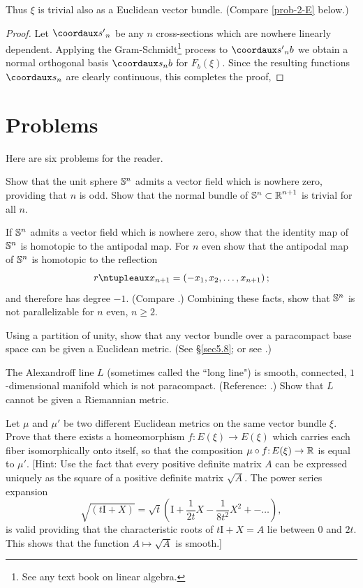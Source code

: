 Thus $\xi$ is trivial also as a Euclidean vector bundle. (Compare
\cref{prob-2-E} below.)
\begin{proof}
	Let $\coord{{s'}_n}$ be any $n$ cross-sections which are nowhere
	linearly dependent. Applying the Gram-Schmidt\footnote{See any text book on linear algebra.} process to $\coord{{s'}_nb}$
	we obtain a normal orthogonal basis $\coord{s_nb}$ for $F_b(\xi)$. Since
	the resulting functions $\coord{s_n}$ are clearly continuous, this completes
	the proof, 
\end{proof}
\section*{Problems}
Here are six problems for the reader.
\begin{problem}\label{prob-2-A}
	Show that the unit sphere $\mathbb{S}^{n}$ admits a vector field
	which is nowhere zero, providing that $n$ is odd. Show that the normal
	bundle of $\mathbb{S}^{n}\subset\boldsymbol{\mathbb{R}}^{n+1}$ is trivial for all $n$.
\end{problem}
\begin{problem}\label{prob-2-B}
	If $\mathbb{S}^{n}$ admits a vector field which is nowhere zero,
	show that the identity map of $\mathbb{S}^{n}$ is homotopic to the antipodal map. For
	$n$ even show that the antipodal map of $\mathbb{S}^{n}$ is homotopic to the reflection
	\[r\ntuple{x_{n+1}}=\left(-x_{1}, x_{2}, \ldots, x_{n+1}\right);\]
	and therefore has degree $-
	1$. (Compare \cite[p. 304]{2}.)
	Combining these facts, show that $\mathbb{S}^{n}$ is not parallelizable for $n$ even,
	$n \geq 2$.
\end{problem}
\begin{problem}\label{prob-2-C}
 Using a 
partition of unity, show that any vector bundle over a paracompact base
space can be given a Euclidean metric. (See \S \ref{sec5.8}; or see \cite[pp. 156
and 171]{41}.)
\end{problem}
\begin{problem}\label{prob-2-D}
	The Alexandroff line $L$ (sometimes called the ``long
	line") is smooth, connected, $1$-dimensional manifold which is not 
	paracompact. (Reference: \cite{42}.) Show that $L$ cannot be given a Riemannian metric.
\end{problem}
\begin{problem}\label{prob-2-E}
 Let $\mu$ and $\mu'$ be two different
Euclidean metrics on the same vector bundle $\xi$. Prove that there exists
a homeomorphism $f\mathpunct{:} E(\xi)\to
E(\xi)$ which carries each fiber isomorphically
onto itself, so that the composition  $\mu\circ f\mathpunct{:} E(\xi)\to
\boldsymbol{\mathbb{R}}$ is equal to $\mu'$. [Hint:
Use the fact that every positive definite matrix $A$ can be expressed
uniquely as the square of a positive definite matrix $\sqrt{A}$. The power
series expansion
\[\sqrt{(t\mathrm{I}+X)}=\sqrt{t}\left(\mathrm{I}+\frac{1}{2t}X-\frac{1}{8t^2}X^2+-\dots\right), \]
is valid providing that the characteristic roots of $t\mathrm{I}+X = A$ lie between
$0$ and $2t$. This shows that the function $A\mapsto \sqrt{A}$ is smooth.]
\end{problem}

